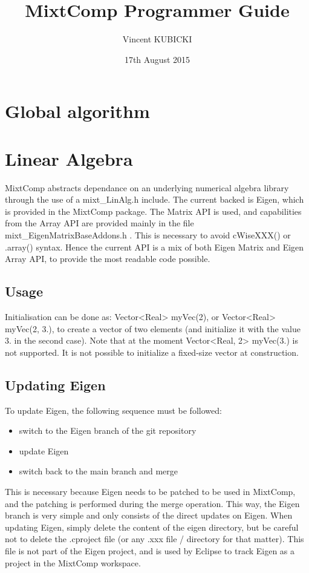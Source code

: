 \documentclass{article}
\title{MixtComp Programmer Guide}
\author{Vincent KUBICKI}
\date{17th August 2015}
\begin{document}
\maketitle

\section{Global algorithm}

\section{Linear Algebra}

MixtComp abstracts dependance on an underlying numerical algebra library through the use of a mixt_LinAlg.h include. The current backed is Eigen, which is provided in the MixtComp package. The Matrix API is used, and capabilities from the Array API are provided mainly in the file mixt_EigenMatrixBaseAddons.h . This is necessary to avoid cWiseXXX() or .array() syntax. Hence the current API is a mix of both Eigen Matrix and Eigen Array API, to provide the most readable code possible.

\subsection{Usage}

Initialisation can be done as: Vector<Real> myVec(2), or Vector<Real> myVec(2, 3.), to create a vector of two elements (and initialize it with the value 3. in the second case). Note that at the moment Vector<Real, 2> myVec(3.) is not supported. It is not possible to initialize a fixed-size vector at construction.

\subsection{Updating Eigen}

To update Eigen, the following sequence must be followed:

\begin{itemize}
\item switch to the Eigen branch of the git repository
\item update Eigen
\item switch back to the main branch and merge
\end{itemize}

This is necessary because Eigen needs to be patched to be used in MixtComp, and the patching is performed during the merge operation. This way, the Eigen branch is very simple and only consists of the direct updates on Eigen. When updating Eigen, simply delete the content of the eigen directory, but be careful not to delete the .cproject file (or any .xxx file / directory for that matter). This file is not part of the Eigen project, and is used by Eclipse to track Eigen as a project in the MixtComp workspace.
\end{document}
